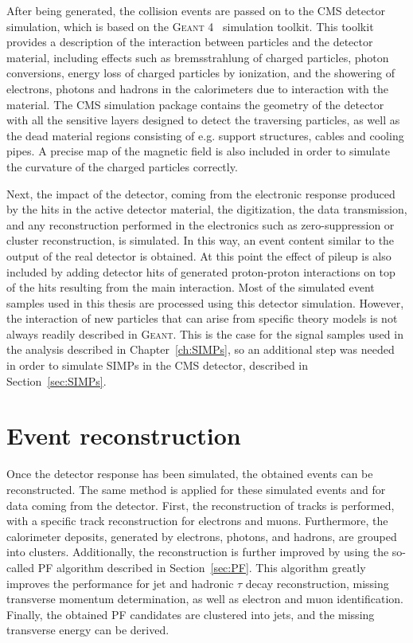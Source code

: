 After being generated, the collision events are passed on to the \ac{CMS} detector simulation, which is based on the \textsc{Geant 4}~\cite{Allison:2006ve} simulation toolkit. This toolkit provides a description of the interaction between particles and the detector material, including effects such as bremsstrahlung of charged particles, photon conversions, energy loss of charged particles by ionization, and the showering of electrons, photons and hadrons in the calorimeters due to interaction with the material. The \ac{CMS} simulation package contains the geometry of the detector with all the sensitive layers designed to detect the traversing particles, as well as the dead material regions consisting of e.g. support structures, cables and cooling pipes. A precise map of the magnetic field is also included in order to simulate the curvature of the charged particles correctly.

Next, the impact of the detector, coming from the electronic response produced by the hits in the active detector material, the digitization, the data transmission, and any reconstruction performed in the electronics such as zero-suppression or cluster reconstruction, is simulated. In this way, an event content similar to the output of the real detector is obtained. At this point the effect of pileup is also included by adding detector hits of generated proton-proton interactions on top of the hits resulting from the main interaction. Most of the simulated event samples used in this thesis are processed using this detector simulation. However, the interaction of new particles that can arise from specific theory models is not always readily described in \textsc{Geant}. This is the case for the signal samples used in the analysis described in Chapter~\ref{ch:SIMPs}, so an additional step was needed in order to simulate \acfp{SIMP} in the \ac{CMS} detector, described in Section~\ref{sec:SIMPs}. 

\section{Event reconstruction}
\label{sec:reconstruction}

Once the detector response has been simulated, the obtained events can be reconstructed. The same method is applied for these simulated events and for data coming from the detector. First, the reconstruction of tracks is performed, with a specific track reconstruction for electrons and muons. Furthermore, the calorimeter deposits, generated by electrons, photons, and hadrons, are grouped into clusters. Additionally, the reconstruction is further improved by using the so-called \acf{PF} algorithm described in Section~\ref{sec:PF}. This algorithm greatly improves the performance for jet and hadronic $\tau$ decay reconstruction, missing transverse momentum determination, as well as electron and muon identification. Finally, the obtained \ac{PF} candidates are clustered into jets, and the missing transverse energy can be derived.

